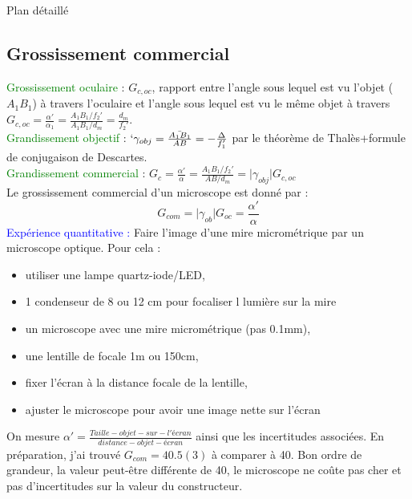 \begin{reportBlock}{Plan détaillé}
  \subsection{Grossissement commercial}
  \textcolor{green}{Grossissement oculaire }: $G_{c,oc}$, rapport entre l'angle sous lequel est vu l'objet ($A_1B_1$) à travers l'oculaire et l'angle sous lequel est vu le même objet à travers $G_{c,oc}=\frac{\alpha'}{\alpha_1}=\frac{A_1B_1/f_2'}{A_1B_1/d_m}=\frac{d_m}{f_2'}$.\\
  \textcolor{green}{Grandissement objectif} : $`\gamma_{obj}=\frac{\bar{A_1B_1}}{AB}=-\frac{\Delta}{f_1'}$ par le théorème de Thalès+formule de conjugaison de Descartes.\\
  \textcolor{green}{Grandissement commercial} : $G_{c}=\frac{\alpha'}{\alpha}=\frac{A_1B_1/f_2'}{AB/d_m}=\lvert \gamma_{obj} \rvert G_{c,oc}$\\  
  Le grossissement commercial d'un microscope est donné par :
  \begin{equation}
     G_{com} = \lvert \gamma_{ob}\rvert G_{oc} = \frac{\alpha'}{\alpha}
  \end{equation}
 \textcolor{blue}{Expérience quantitative :} Faire l'image d'une mire micrométrique par un microscope optique. Pour cela : \begin{itemize}
      \item utiliser une lampe quartz-iode/LED,
      \item 1 condenseur de 8 ou 12 cm pour focaliser l lumière sur la mire
      \item un microscope avec une mire micrométrique (pas 0.1mm),
      \item une lentille de focale 1m ou 150cm,
      \item fixer l'écran à la distance focale de la lentille,
      \item ajuster le microscope pour avoir une image nette sur l'écran
  \end{itemize} 
 On mesure $\alpha'= \frac{Taille-objet-sur-l'écran}{distance-objet-écran}$ ainsi que les incertitudes associées. 
  En préparation, j'ai trouvé $G_{com}=40.5(3)$ à comparer à 40. Bon ordre de grandeur, la valeur peut-être différente de 40, le microscope ne coûte pas cher et pas d'incertitudes sur la valeur du constructeur.\\
  

\end{reportBlock}
